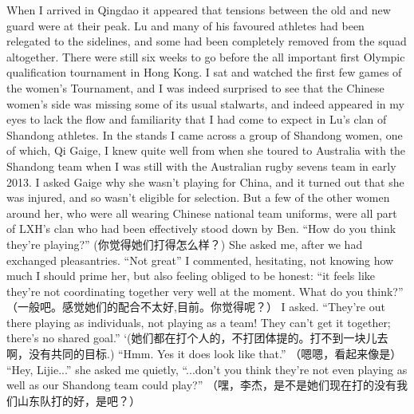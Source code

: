   When I arrived in Qingdao it appeared that tensions between the old and new guard were at their peak.  Lu and many of his favoured athletes had been relegated to the sidelines, and some had been completely removed from the squad altogether.  There were still six weeks to go before the all important first Olympic qualification tournament in Hong Kong.  I sat and watched the first few games of the women's Tournament, and I was indeed surprised to see that the Chinese women's side was missing some of its usual stalwarts, and indeed appeared in my eyes to lack the flow and familiarity that I had come to expect in Lu's clan of Shandong athletes.  In the stands I came across a group of Shandong women, one of which, Qi Gaige, I knew quite well from when she toured to Australia with the Shandong team when I was still with the Australian rugby sevens team in early 2013.  I asked Gaige why she wasn't playing for China, and it turned out that she was injured, and so wasn't eligible for selection.  But a few of the other women around her, who were all wearing Chinese national team uniforms, were all part of LXH's clan who had been effectively stood down by Ben. ``How do you think they're playing?'' (你觉得她们打得怎么样？) She asked me, after we had exchanged pleasantries. ``Not great'' I commented, hesitating, not knowing how much I should prime her, but also feeling obliged to be honest: ``it feels like they’re not coordinating together very well at the moment.  What do you think?'' （一般吧。感觉她们的配合不太好,目前。你觉得呢？） I asked.  ``They’re out there playing as individuals, not playing as a team! They can't get it together; there's no shared goal.'' `(她们都在打个人的，不打团体提的。打不到一块儿去啊，没有共同的目标.)  ``Hmm. Yes it does look like that.'' （嗯嗯，看起来像是） ``Hey, Lijie...'' she asked me quietly, ``...don’t you think they’re not even playing as well as our Shandong team could play?'' （嘿，李杰，是不是她们现在打的没有我们山东队打的好，是吧？）

